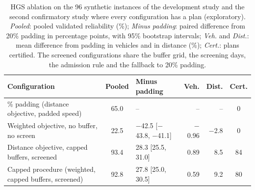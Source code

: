 \begin{table}[t]
\centering
\small
\setlength{\tabcolsep}{4pt}
\caption{HGS ablation on the 96 synthetic instances of the development study and the second confirmatory study where every configuration has a plan (exploratory). \emph{Pooled}: pooled validated reliability (\%); \emph{Minus padding}: paired difference from 20\% padding in percentage points, with 95\% bootstrap intervals; \emph{Veh.} and \emph{Dist.}: mean difference from padding in vehicles and in distance (\%); \emph{Cert.}: plans certified. The screened configurations share the buffer grid, the screening days, the admission rule and the fallback to 20\% padding.}
\label{tab:ablation}
\begin{tabular}{@{}>{\raggedright\arraybackslash}p{5.6cm}clrrc@{}}
\toprule
Configuration & Pooled & Minus padding & Veh. & Dist. & Cert.\\
\midrule
20\% padding (distance objective, padded speed) & 65.0 & -- & -- & -- & 0\\
Weighted objective, no buffer, no screen & 22.5 & $-$42.5 [$-$43.8, $-$41.1] & $-$0.96 & $-$2.8 & 0\\
Distance objective, capped buffers, screened & 93.4 & 28.3 [25.5, 31.0] & 0.89 & 8.5 & 84\\
Capped procedure (weighted, capped buffers, screened) & 92.8 & 27.8 [25.0, 30.5] & 0.59 & 9.2 & 80\\
\bottomrule
\end{tabular}
\end{table}
